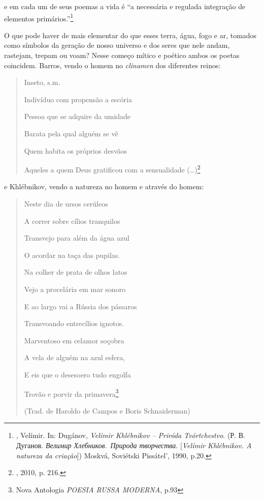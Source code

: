 e em cada um de seus poemas a vida é ``a necessária e regulada
integração de elementos primários.''\footnote{, Velímir. In:
  Dugánov,  \emph{Velímir Khlébnikov -- Priróda Tvórtchestvo}. (Р.
  В. Дуганов. \emph{Велимир Хлебников}.~\emph{Природа творчества}.
  {[}\emph{Velímir Khlébnikov. A natureza da criação}{]}) Moskvá,
  Soviétski Pissátel', 1990, p.20.}

O que pode haver de mais elementar do que esses terra, água, fogo e ar,
tomados como símbolos da geração de nosso universo e dos seres que nele
andam, rastejam, trepam ou voam? Nesse começo mítico e poético ambos os
poetas coincidem. Barros, vendo o homem no \emph{clinamen} dos
diferentes reinos:

\begin{quote}
Inseto, s.m.

Indivíduo com propensão a escória

Pessoa que se adquire da umidade

Barata pela qual alguém se vê

Quem habita os próprios desvãos

Aqueles a quem Deus gratificou com a sensualidade (\ldots{})\footnote{,
  2010, p. 216.}
\end{quote}

e Khlébnikov, vendo a natureza no homem e através do homem:

\begin{quote}
Neste dia de ursos cerúleos

A correr sobre cílios tranquilos

Transvejo para além da água azul

O acordar na taça das pupilas.

Na colher de prata de olhos latos

Vejo a procelária em mar sonoro

E ao largo vai a Rússia dos pássaros

Transvoando entrecílios ignotos.

Marventoso em celamor soçobra

A vela de alguém na azul esfera,

E eis que o desesoero tudo engolfa

Trovão e porvir da primavera\footnote{Nova Antologia \emph{POESIA RUSSA
  MODERNA}, p.93}

(Trad. de Haroldo de Campos e Boris Schnaiderman)
\end{quote}

